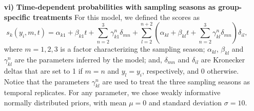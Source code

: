 \documentclass[11pt, a4paper]{article}
\DeclareRobustCommand{\hlc}[1]{{\sethlcolor{blau}\hl{#1}}}
\begin{document}
\begin{itemize}
\item[\textbf{vi)}] \textbf{Time-dependent probabilities with sampling seasons as group-specific treatments} For this model, we defined the scores as
\begin{equation}
s_k\left(y_i, m, t\right)=\alpha_{k1} +\beta_{k1} t + \sum_{n=2}^{3} \gamma_{k1}^n\delta_{mn} + \sum_{l=2}^{n+2} \left(\alpha_{kl}+\beta_{kl} t  + \sum_{n=2}^{3} \gamma_{kl}^n\delta_{mn}\right)\delta_{il},
\end{equation}
where $m={1,2,3}$ is a factor characterizing the sampling season; $\alpha_{kl}$, $\beta_{kl}$ and $\gamma_{kl}^n$ are the parameters inferred by the model; and, $\delta_{mn}$ and $\delta_{il}$ are Kronecker deltas that are set to 1 if $m=n$ and $y_l=y_i$, respectively, and 0 otherwise. Notice that the parameters $\gamma_{kl}^n$ are used to treat the three sampling seasons as temporal replicates. For any parameter, we chose weakly informative normally distributed priors, with mean $\mu=0$ and standard deviation $\sigma=10$.


\end{itemize}
\end{document}
